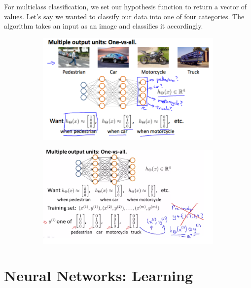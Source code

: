 \documentclass{article}
\begin{document}
        \pagebreak

        \noindent For multiclass classification, we set our hypothesis function to return a vector of values.
        Let's say we wanted to classify our data into one of four categories. The algorithm takes an input as
        an image and classifies it accordingly.

        \begin{figure}[hbt!]
            \centering
            \begin{subfigure}[b]{.45\linewidth}
                \includegraphics[scale=0.5]{Resources/Multiclass_Nets.PNG}
            \end{subfigure}
            \begin{subfigure}[b]{.45\linewidth}
                \includegraphics[scale=0.5]{Resources/Multiclass_Nets2}
            \end{subfigure}
        \end{figure}


    \pagebreak
    \section{Neural Networks: Learning}
\end{document}
